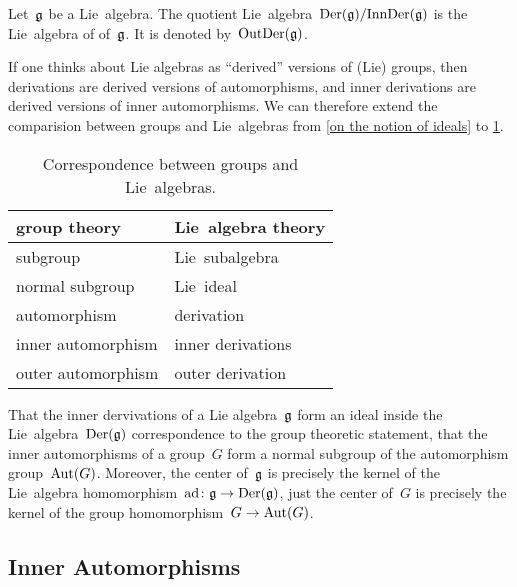 \begin{definition}
  Let~$\mathfrak{g}$ be a Lie~algebra.
  The quotient Lie~algebra~$\operatorname{Der}(\mathfrak{g}) / {\operatorname{InnDer}(\mathfrak{g})}$ is the Lie~algebra of  of~$\mathfrak{g}$.
  It is denoted by~$\operatorname{OutDer}(\mathfrak{g})$.
\end{definition}


\begin{remark}
  If one thinks about Lie algebras as \enquote{derived} versions of (Lie) groups, then derivations are derived versions of automorphisms, and inner derivations are derived versions of inner automorphisms.
  We can therefore extend the comparision between groups and Lie~algebras from \cref{on the notion of ideals} to \cref{correspondence between groups and lie algebras}.
  \begin{table}
    \centering
    \begin{tabular}{ll}
      \toprule
      group theory
      &
      Lie~algebra theory
      \\
      \midrule
      subgroup
      &
      Lie~subalgebra
      \\
      normal subgroup
      &
      Lie~ideal
      \\
      automorphism
      &
      derivation
      \\
      inner automorphism
      &
      inner derivations
      \\
      outer automorphism
      &
      outer derivation
      \\
      \bottomrule
    \end{tabular}
    \caption{Correspondence between groups and Lie~algebras.}
    \label{correspondence between groups and lie algebras}
  \end{table}

  That the inner dervivations of a Lie algebra~$\mathfrak{g}$ form an ideal inside the Lie~algebra~$\operatorname{Der}(\mathfrak{g})$ correspondence to the group theoretic statement, that the inner automorphisms of a group~$G$ form a normal subgroup of the automorphism group~$\operatorname{Aut}(G)$.
  Moreover, the center of~$\mathfrak{g}$ is precisely the kernel of the Lie~algebra homomorphism~$\ad \colon \glie \to \Der(\glie)$, just the center of~$G$ is precisely the kernel of the group homomorphism~$G \to \Aut(G)$.
\end{remark}



\subsection{Inner Automorphisms}


